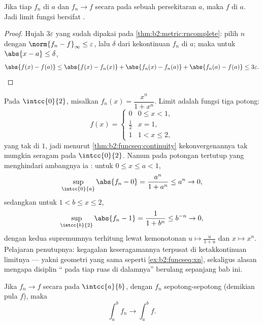 \begin{theorem}[Kekontinuan]\label{thm:b2:funcseq:continuity}
Jika tiap $f_n$  di $a$ dan $f_n \to f$ secara  pada
sebuah persekitaran $a$, maka $f$  di $a$. Jadi limit 
fungsi  bersifat .
\end{theorem}

\begin{proof}
Hujah $3\varepsilon$ yang sudah dipakai pada
\cref{thm:b2:metric:rncomplete}: pilih $n$ dengan $\norm{f_n -
f}_\infty \leq \varepsilon$, lalu $\delta$ dari kekontinuan
$f_n$ di $a$; maka untuk $\abs{x - a} \leq \delta$,
\[
\abs{f(x) - f(a)} \leq \abs{f(x) - f_n(x)} + \abs{f_n(x) - f_n(a)}
+ \abs{f_n(a) - f(a)} \leq 3\varepsilon . \qedhere
\]
\end{proof}

\begin{example}\label{ex:b2:funcseq:threshold}
Pada $\intcc{0}{2}$, misalkan $f_n(x) = \dfrac{x^n}{1 + x^n}$. Limit
 adalah fungsi tiga potong:
\[
f(x) = \begin{cases} 0 & 0 \leq x < 1,\\[2pt]
\tfrac12 & x = 1,\\[2pt]
1 & 1 < x \leq 2, \end{cases}
\]
yang tak  di $1$, jadi menurut \cref{thm:b2:funcseq:continuity}
kekonvergenannya tak mungkin seragam pada $\intcc{0}{2}$. Namun pada
potongan tertutup yang menghindari ambangnya ia : untuk $0 \leq x
\leq a < 1$,
\[
\sup_{\intcc{0}{a}}\abs{f_n - 0}
= \frac{a^n}{1 + a^n} \leq a^n \to 0 ,
\]
sedangkan untuk $1 < b \leq x \leq 2$,
\[
\sup_{\intcc{b}{2}}\abs{f_n - 1}
= \frac{1}{1 + b^n} \leq b^{-n} \to 0 ,
\]
dengan kedua supremumnya terhitung lewat kemonotonan $u \mapsto
\frac{u}{1+u}$ dan $x \mapsto x^n$. Pelajaran penutupnya: kegagalan
keseragamannya terpusat di ketakkontinuan limitnya --- yakni geometri
yang sama seperti \cref{ex:b2:funcseq:xn}, sekaligus alasan mengapa
disiplin `` pada tiap ruas di dalamnya'' berulang sepanjang bab ini.
\end{example}

\begin{theorem}\label{thm:b2:funcseq:integration}
Jika $f_n \to f$ secara  pada $\intcc{a}{b}$, dengan $f_n$
 sepotong-sepotong (demikian pula $f$), maka
\[
\int_a^b f_n \longrightarrow \int_a^b f .
\]
\end{theorem}


